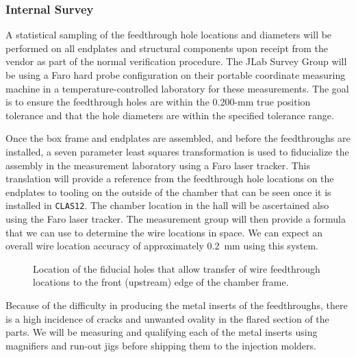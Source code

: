 \subsubsection{Internal Survey}
\label{internal}

A statistical sampling of the feedthrough hole locations and diameters 
will be performed on all endplates and structural components upon receipt 
from the vendor as part of the normal verification procedure.  The JLab
Survey Group will be using a Faro hard probe configuration on their portable 
coordinate measuring machine in a temperature-controlled laboratory for 
these measurements. The goal is to ensure the feedthrough holes are within 
the 0.200-mm true position tolerance and that the hole diameters are within 
the specified tolerance range. 

Once the box frame and endplates are assembled, and before the feedthroughs 
are installed, a seven parameter least squares transformation is used to 
fiducialize the assembly in the measurement laboratory using a Faro laser 
tracker.  This translation will provide a reference from the feedthrough hole 
locations on the endplates to tooling on the outside of the chamber that can 
be seen once it is installed in {\tt CLAS12}.  The chamber location in the 
hall will be ascertained also using the Faro laser tracker.  The measurement 
group will then provide a formula that we can use to determine the wire 
locations in space.  We can expect an overall wire location accuracy of 
approximately 0.2~mm using this system.

\begin{figure}[htbp]
\vspace{8.2cm}
\caption{\small{Location of the fiducial holes that allow transfer of wire 
feedthrough locations to the front (upstream) edge of the chamber frame.}}
\label{holes}
\end{figure}

Because of the difficulty in producing the metal inserts of the feedthroughs, 
there is a high incidence of cracks and unwanted ovality in the flared section 
of the parts.  We will be measuring and qualifying each of the metal inserts 
using magnifiers and run-out jigs before shipping them to the injection 
molders. 

\vskip 0.2cm

